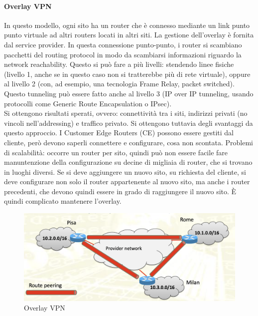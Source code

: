 \documentclass{article}
\begin{document}
\paragraph{Overlay VPN} In questo modello, ogni sito ha un router che è connesso mediante un link punto punto virtuale ad altri routers locati in altri siti. La gestione dell'overlay è fornita dal service provider. In questa connessione punto-punto, i router si scambiano pacchetti del routing protocol in modo da scambiarsi informazioni riguardo la network reachability. Questo si può fare a più livelli: stendendo linee fisiche (livello 1, anche se in questo caso non si tratterebbe più di rete virtuale), oppure al livello 2 (con, ad esempio, una tecnologia Frame Relay, packet switched). Questo tunneling può essere fatto anche al livello 3 (IP over IP tunneling, usando protocolli come Generic Route Encapsulation o IPsec). \\ Si ottengono risultati sperati, ovvero: connettività tra i siti, indirizzi privati (no vincoli nell'addressing) e traffico privato. Si ottengono tuttavia degli svantaggi da questo approccio. I Customer Edge Routers (CE) possono essere gestiti dal cliente, però devono saperli connettere e configurare, cosa non scontata. Problemi di scalabilità: occorre un router per sito, quindi può non essere facile fare manuntenzione della configurazione su decine di migliaia di router, che si trovano in luoghi diversi. Se si deve aggiungere un nuovo sito, su richiesta del cliente, si deve configurare non solo il router appartenente al nuovo sito, ma anche i router precedenti, che devono quindi essere in grado di raggiungere il nuovo sito. È quindi complicato mantenere l'overlay.
\begin{figure}[H]
    \centering
    \includegraphics[scale=0.5]{figures/overlay vpn.png}
    \caption{Overlay VPN}
\end{figure}
\end{document}
